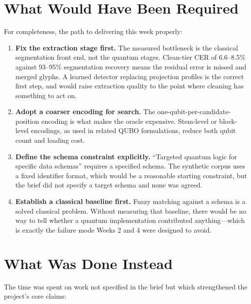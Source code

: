 \documentclass[11pt,a4paper]{article}
\begin{document}
\section{What Would Have Been Required}

For completeness, the path to delivering this week properly:

\begin{enumerate}
\item \textbf{Fix the extraction stage first.} The measured bottleneck is the
      classical segmentation front end, not the quantum stages. Clean-tier CER of
      6.6--8.5\% against 93--95\% segmentation recovery means the residual error
      is missed and merged glyphs. A learned detector replacing projection
      profiles is the correct first step, and would raise extraction quality to
      the point where cleaning has something to act on.
\item \textbf{Adopt a coarser encoding for search.} The
      one-qubit-per-candidate-position encoding is what makes the oracle
      expensive. Stem-level or block-level encodings, as used in related QUBO
      formulations, reduce both qubit count and loading cost.
\item \textbf{Define the schema constraint explicitly.} ``Targeted quantum logic
      for specific data schemas'' requires a specified schema. The synthetic
      corpus uses a fixed identifier format, which would be a reasonable starting
      constraint, but the brief did not specify a target schema and none was
      agreed.
\item \textbf{Establish a classical baseline first.} Fuzzy matching against a
      schema is a solved classical problem. Without measuring that baseline,
      there would be no way to tell whether a quantum implementation contributed
      anything---which is exactly the failure mode Weeks 2 and 4 were designed to
      avoid.
\end{enumerate}

\section{What Was Done Instead}

The time was spent on work not specified in the brief but which strengthened the
project's core claims:
\end{document}
